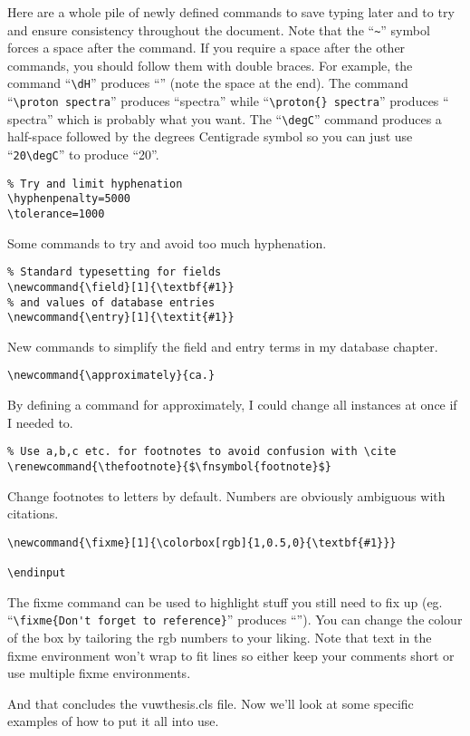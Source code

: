 \normalsize\doublespacing
Here are a whole pile of newly defined commands to save typing later and to try and ensure consistency throughout the document.  Note that the ``\small\verb$~$\normalsize'' symbol forces a space after the command.  If you require a space after the other commands, you should follow them with double braces.  For example, the command ``\small\verb$\dH$\normalsize'' produces ``\dH'' (note the space at the end).  The command ``\small\verb$\proton spectra$\normalsize'' produces ``\proton spectra'' while ``\small\verb$\proton{} spectra$\normalsize'' produces ``\proton{} spectra'' which is probably what you want.  The ``\small\verb$\degC$\normalsize'' command produces a half-space followed by the degrees Centigrade symbol so you can just use ``\small\verb$20\degC$\normalsize'' to produce ``20\degC''.

\small\singlespacing
\begin{verbatim}
% Try and limit hyphenation
\hyphenpenalty=5000
\tolerance=1000
\end{verbatim}

\normalsize\doublespacing
Some commands to try and avoid too much hyphenation.

\small\singlespacing
\begin{verbatim}
% Standard typesetting for fields
\newcommand{\field}[1]{\textbf{#1}}
% and values of database entries
\newcommand{\entry}[1]{\textit{#1}}
\end{verbatim}

\normalsize\doublespacing
New commands to simplify the field and entry terms in my database chapter.

\small\singlespacing
\begin{verbatim}
\newcommand{\approximately}{ca.}
\end{verbatim}

\normalsize\doublespacing
By defining a command for approximately, I could change all instances at once if I needed to.

\small\singlespacing
\begin{verbatim}
% Use a,b,c etc. for footnotes to avoid confusion with \cite
\renewcommand{\thefootnote}{$\fnsymbol{footnote}$}
\end{verbatim}

\normalsize\doublespacing
Change footnotes to letters by default.  Numbers are obviously ambiguous with citations.

\small\singlespacing
\begin{verbatim}
\newcommand{\fixme}[1]{\colorbox[rgb]{1,0.5,0}{\textbf{#1}}}

\endinput
\end{verbatim}
\normalsize\doublespacing
The fixme command can be used to highlight stuff you still need to fix up (eg. ``\small\verb$\fixme{Don't forget to reference}$\normalsize'' produces ``'').  You can change the colour of the box by tailoring the rgb numbers to your liking.  Note that text in the fixme environment won't wrap to fit lines so either keep your comments short or use multiple fixme environments.

And that concludes the vuwthesis.cls file.  Now we'll look at some specific examples of how to put it all into use.
